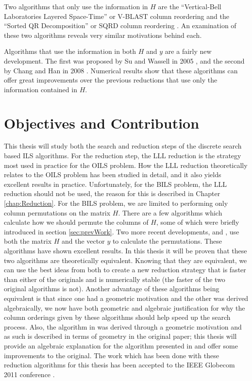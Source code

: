 \documentclass[12pt,Bold,letterpaper]{mcgilletdclass}
\newcommand{\vsp}{\vspace{\baselineskip}}
\begin{document}
Two algorithms that only use the information in $H$ are the ``Vertical-Bell Laboratories Layered Space-Time'' or V-BLAST column reordering \cite{FosGVW99} and the ``Sorted QR Decomposition'' or SQRD column reordering \cite{WubBRKK01}. An examination of these two algorithms reveals very similar motivations behind each.

Algorithms that use the information in both $H$ and $y$ are a fairly new development. The first was proposed by Su and Wassell in 2005 \cite{SuW05}, and the second by Chang and Han in 2008 \cite{ChaH05}. Numerical results show that these algorithms can offer great improvements over the previous reductions that use only the information contained in $H$.

\vsp \section{Objectives and Contribution}

This thesis will study both the search and reduction steps of the discrete search based ILS algorithms. For the reduction step, the LLL reduction \cite{LenLL82} is the strategy most used in practice for the OILS problem. How the LLL reduction theoretically relates to the OILS problem has been studied in detail, and it also yields excellent results in practice. Unfortunately, for the BILS problem, the LLL reduction should not be used, the reason for this is described in Chapter \ref{chap:Reduction}. For the BILS problem, we are limited to performing only column permutations on the matrix $H$. There are a few algorithms which calculate how we should permute the columns of $H$, some of which were briefly introduced in section \ref{sec:prevWork}. Two more recent developments, \cite{ChaH05} and \cite{SuW05}, use both the matrix $H$ and the vector $y$ to calculate the permutations. These algorithms have shown excellent results. In this thesis it will be proven that these two algorithms are theoretically equivalent. Knowing that they are equivalent, we can use the best ideas from both to create a new reduction strategy that is faster than either of the originals and is numerically stable (the faster of the two original algorithms is not). Another advantage of these algorithms being equivalent is that since one had a geometric motivation and the other was derived algebraically, we now have both geometric and algebraic justification for why the column orderings given by these algorithms should help speed up the search process. Also, the algorithm in \cite{SuW05} was derived through a geometric motivation and as such is described in terms of geometry in the original paper; this thesis will provide an algebraic explanation for the algorithm presented in \cite{SuW05} and offer some improvements to the original. The work which has been done with these reduction algorithms for this thesis has been accepted to the IEEE Globecom 2011 conference \cite{BreC11}.
\end{document}
